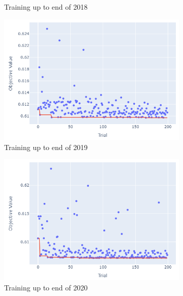 \documentclass[12pt,twoside]{report}
\begin{document}
\begin{figure}[htb]
\begin{subfigure}{.33\linewidth}
  \caption{Training up to end of 2018}
\end{subfigure}
\par\bigskip
\par\bigskip
\begin{subfigure}{.33\linewidth}
  \centering
  \includegraphics[width=0.95\linewidth]{figures/va_lr_cutoff_2019.png}
  \caption{Training up to end of 2019}
\end{subfigure}%
\begin{subfigure}{.33\linewidth}
  \centering
  \includegraphics[width=0.95\linewidth]{figures/va_lr_cutoff_2020.png}
  \caption{Training up to end of 2020}
\end{subfigure}%
\begin{subfigure}{.33\linewidth}
  \centering

\end{subfigure}
\end{figure}
\end{document}
